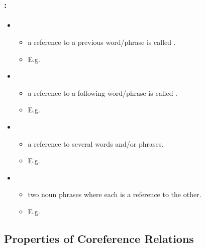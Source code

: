 \documentclass[xcolor=table]{beamer}
\begin{document}
\begin{frame}
	\frametitle{\insertshortsubtitle: \insertsection}
	\framesubtitle{\insertsubsection}
	
	\begin{itemize}
		\item {}
		\begin{itemize}
			\item a reference to a previous word/phrase is called .
			\item E.g. 
		\end{itemize}
	
		\item {}
		\begin{itemize}
			\item a reference to a following word/phrase is called .
			\item E.g. 
		\end{itemize}
	
		\item {}
		\begin{itemize}
			\item a reference to several words and/or phrases.
			\item E.g. 
		\end{itemize}
	
		\item {}
		\begin{itemize}
			\item two noun phrases where each is a reference to the other.
			\item E.g. 
		\end{itemize}
	\end{itemize}
	
\end{frame}

\subsection{Properties of Coreference Relations}
\end{document}
